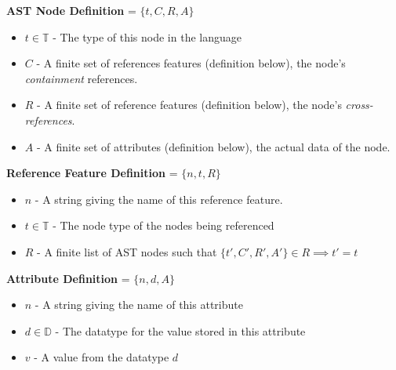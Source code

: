 \documentclass{article}
\begin{document}
\textbf{AST Node Definition} = $\{t,C,R,A\}$ 
\begin{itemize}
\item $t\in \mathbb{T}$ - The type of this node in the language
\item $C$ - A finite set of references features (definition below), the node's \emph{containment} references.
\item $R$ - A finite set of reference features (definition below), the node's \emph{cross-references}.
\item $A$ - A finite set of attributes (definition below), the actual data of the node.
\end{itemize}
%
\textbf{Reference Feature Definition} = $\{n,t,R\}$ 
\begin{itemize}
\item $n$ - A string giving the name of this reference feature.
\item $t\in \mathbb{T}$ - The node type of the nodes being referenced 
\item $R$ - A finite list of AST nodes such that $\{t',C',R',A'\} \in R \implies t'=t$
\end{itemize}
%
\textbf{Attribute Definition} = $\{n,d,A\}$ 
\begin{itemize}
\item $n$ - A string giving the name of this attribute
\item $d\in \mathbb{D}$ - The datatype for the value stored in this attribute
\item $v$ - A value from the datatype $d$
\end{itemize}
%
\end{document}

